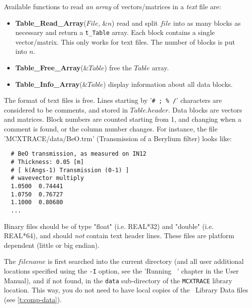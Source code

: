 Available functions to read \emph{an array} of vectors/matrices in a \emph{text} file are:
\begin{itemize}
\item {\bfseries Table\_Read\_Array}($File$, \&$n$) read and split $file$
into as many blocks as necessary and return a \verb+t_Table+ array.
Each block contains a single vector/matrix. This only works for text files.
The number of blocks is put into $n$.
\item {\bfseries Table\_Free\_Array}(\&$Table$) free the $Table$ array.
\item {\bfseries Table\_Info\_Array}(\&$Table$) display information about all data blocks.
\end{itemize}

The format of text files is free. Lines starting by '\verb+# ; % /+' characters are considered to be comments, and stored in $Table.header$. Data blocks are vectors and matrices. Block numbers are counted starting from 1, and changing when a comment is found, or the column number changes. For instance, the file 'MCXTRACE/data/BeO.trm' (Transmission of a Berylium filter) looks like:
\begin{lstlisting}
  # BeO transmission, as measured on IN12
  # Thickness: 0.05 [m]
  # [ k(Angs-1) Transmission (0-1) ]
  # wavevector multiply
  1.0500  0.74441
  1.0750  0.76727
  1.1000  0.80680
  ...
\end{lstlisting}
Binary files should be of type "float" (i.e. REAL*32) and "double" (i.e. REAL*64),
and should \emph{not} contain text header lines. These files are platform
dependent (little or big endian).

The $filename$ is first searched into the current directory (and all user additional locations specified using the \verb+-I+ option, see the 'Running \MCX\ ' chapter in the User Manual), and if not found, in the \verb+data+ sub-directory of the \verb+MCXTRACE+ library location. 
 This way, you do not need to have local copies of the \MCX\ Library Data files (see \cref{t:comp-data}).

